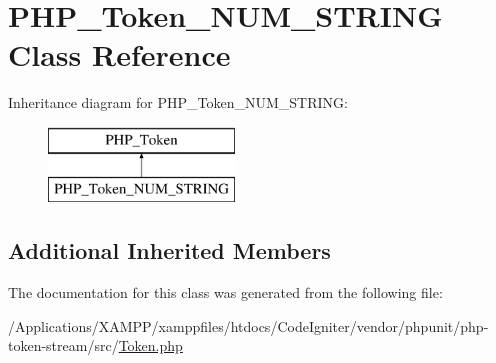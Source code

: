 \hypertarget{class_p_h_p___token___n_u_m___s_t_r_i_n_g}{}\section{P\+H\+P\+\_\+\+Token\+\_\+\+N\+U\+M\+\_\+\+S\+T\+R\+I\+NG Class Reference}
\label{class_p_h_p___token___n_u_m___s_t_r_i_n_g}
Inheritance diagram for P\+H\+P\+\_\+\+Token\+\_\+\+N\+U\+M\+\_\+\+S\+T\+R\+I\+NG\+:\begin{figure}[H]
\begin{center}
\leavevmode
\includegraphics[height=2.000000cm]{class_p_h_p___token___n_u_m___s_t_r_i_n_g}
\end{center}
\end{figure}
\subsection*{Additional Inherited Members}


The documentation for this class was generated from the following file\+:\begin{DoxyCompactItemize}
\item 
/\+Applications/\+X\+A\+M\+P\+P/xamppfiles/htdocs/\+Code\+Igniter/vendor/phpunit/php-\/token-\/stream/src/\mbox{\hyperlink{_token_8php}{Token.\+php}}\end{DoxyCompactItemize}

